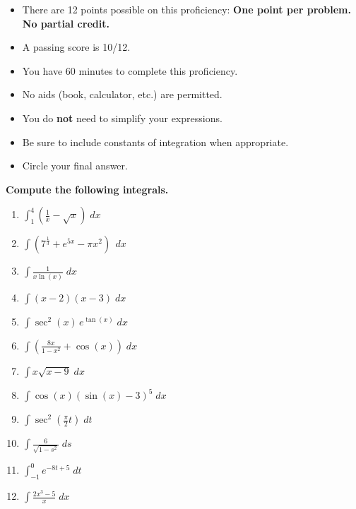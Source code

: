 \documentclass[12pt]{article}
\newcommand{\ds}{\displaystyle}
\begin{document}
\begin{itemize}
\addtolength\itemsep{-1mm}
\item There are 12 points possible on this proficiency: \textbf{One point per problem. No partial credit.}

\item A passing score is 10/12.

\item You have 60 minutes to complete this proficiency.

\item No aids (book, calculator, etc.) are permitted.  

\item You do \textbf{not} need to simplify your expressions.

\item Be sure to include constants of integration when appropriate.

\item Circle your final answer.
\end{itemize}

\noindent \textbf{Compute the following integrals.}

\begin{enumerate}
\item $\ds \int_1^4 \left(\frac{1}{x} -\sqrt{x}\right)\;dx$
\vfill

\item $\ds \int \left(7^{\frac 13}+e^{5x} - \pi x^2\right)\;\, dx$
\vfill

\item $\ds \int \frac{1}{x\ln(x)} \; dx$
\vfill

\newpage

\item $\ds \int (x-2)(x-3)\; dx$
\vfill

\item $\ds \int \sec^2(x)\,e^{\tan(x)}\; dx$
\vfill

\item $\ds \int \left(\frac{8x}{1-x^2} + \cos(x)\right)\; dx$
\vfill

\newpage

\item $\ds\int x\sqrt{x-9}\; dx$
\vfill

\item $\ds\int \cos(x) \left(\sin(x)-3\right)^5\;dx$
\vfill

\item $\ds\int \sec^2\left(\frac{\pi}{2} t\right) \; dt$
\vfill

\newpage

\item $\ds\int \frac{6}{\sqrt{1-s^2}}\;ds$
\vfill

\item $\ds\int_{-1}^0 e^{-8t+5}\; dt$
\vfill

\item $\ds\int \frac{2x^3-5}{x}\; dx$
\vfill

\end{enumerate}
\end{document}
